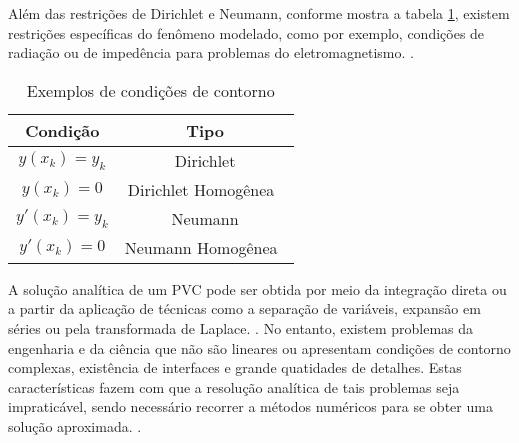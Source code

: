 Além das restrições de Dirichlet e Neumann, conforme mostra a tabela \ref{tab:cond}, existem restrições específicas do fenômeno modelado, como por exemplo, condições de radiação ou de impedência para problemas do eletromagnetismo. \citep[p. 20]{jin}. 


\begin{table}	
	\centering
	\begin{tabular}{|c|c|}	
		\hline
		\textbf{Condição} 
		& \textbf{Tipo} \\	
		\hline
		$y(x_k) = y_k $ 
		& Dirichlet \\
		\hline
		$y(x_k) = 0$
		& Dirichlet Homogênea\  \\
		\hline
		$y'(x_k) = y_k$
		& Neumann \\
		\hline
		$y'(x_k) = 0$
		& Neumann Homogênea\  \\
		\hline
	\end{tabular}
	\caption{Exemplos de condições de contorno}
	\label{tab:cond}
\end{table}


A solução analítica de um PVC pode ser obtida por meio da integração direta ou a partir da aplicação de técnicas como a separação de variáveis, expansão em séries ou pela transformada de Laplace. \citep[p. 31, 191, 239]{boyce_diprima} \citep[p. 59, 263, 355]{powers}.
No entanto, existem problemas da engenharia e da ciência que não são lineares ou apresentam  condições de contorno complexas, existência de interfaces e grande quatidades de detalhes.  Estas características fazem com que a resolução analítica de tais problemas seja impraticável, sendo necessário recorrer a métodos numéricos para se obter uma solução aproximada. \citep[p. 447]{boyce_diprima} \citep[p.397]{powers}.



